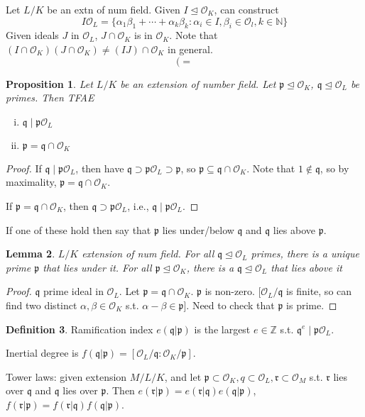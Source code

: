 \documentclass{article}
\theoremstyle{definition}
\newtheorem{defn}{Definition}[section]
\theoremstyle{remark}
\theoremstyle{plain}
\newtheorem{lem}[defn]{Lemma}
\newtheorem{prop}[defn]{Proposition}
\newcommand{\NN}{\mathbb{N}}
\newcommand{\ZZ}{\mathbb{Z}}
\begin{document}
Let $L/K$ be an extn of num field.
Given $I\trianglelefteq\mathcal O_K$, can construct 
\[I\mathcal O_L=\{\alpha_1\beta_1+\cdots+\alpha_k\beta_k:\alpha_i\in I, \beta_i\in\mathcal O_l, k\in\NN\}\]
Given ideals $J$ in $\mathcal O_L$, $J\cap\mathcal O_K$ is in $\mathcal O_K$. Note that
\((I\cap\mathcal{O}_K)(J\cap\mathcal{O}_K)\neq(IJ)\cap\mathcal{O}_K\) in general.
\[(=\tag{Owen's Signature}\]
\begin{prop}
    Let $L/K$ be an extension of number field. Let $\mathfrak p\trianglelefteq\mathcal O_K$, $\mathfrak q\trianglelefteq \mathcal O_L$ be primes. Then TFAE
    \begin{enumerate}[(i)]
        \item $\mathfrak q\mid \mathfrak p\mathcal O_L$\\
        \item $\mathfrak p=\mathfrak q\cap\mathcal O_K$
    \end{enumerate}
\end{prop}
\begin{proof}
    If $\mathfrak q\mid \mathfrak p\mathcal O_L$, then have $\mathfrak q\supset\mathfrak p\mathcal O_L\supset\mathfrak p$, so $\mathfrak p\subseteq\mathfrak q\cap\mathcal O_K$. Note that $1\notin \mathfrak q$, so by maximality, $\mathfrak p=\mathfrak q\cap\mathcal O_K$.

    If $\mathfrak p=\mathfrak q\cap\mathcal O_K$, then $\mathfrak q\supset \mathfrak p\mathcal O_L$, i.e., $\mathfrak q\mid \mathfrak p\mathcal O_L$.
\end{proof}
If one of these hold then say that $\mathfrak p$ lies under/below $\mathfrak q$ and $\mathfrak q$ lies above $\mathfrak p$.
\begin{lem}
    $L/K$ extension of num field. For all $\mathfrak q\trianglelefteq\mathcal O_L$ primes, there is a unique prime $\mathfrak p$ that lies under it. For all $\mathfrak p\trianglelefteq \mathcal O_K$, there is a $\mathfrak q\trianglelefteq \mathcal O_L$ that lies above it
\end{lem}
\begin{proof}
    $\mathfrak q$ prime ideal in $\mathcal O_L$. Let $\mathfrak p=\mathfrak q\cap \mathcal O_K$. $\mathfrak p$ is non-zero. [$\mathcal O_L/\mathfrak q$ is finite, so can find two distinct $\alpha,\beta\in\mathcal O_K$ s.t. $\alpha-\beta\in\mathfrak p$]. Need to check that $\mathfrak p$ is prime.
\end{proof}
\begin{defn}
    Ramification index $e(\mathfrak q|\mathfrak p)$ is the largest $e\in\ZZ$ s.t. $\mathfrak q^e\mid\mathfrak p\mathcal O_L$.

    Inertial degree is $f(\mathfrak q|\mathfrak p)=[\mathcal O_L/\mathfrak q:\mathcal O_K/\mathfrak p]$.
\end{defn}
Tower laws: given extension $M/L/K$, and let $\mathfrak p\subset\mathcal O_K,q\subset \mathcal O_L, \mathfrak r\subset \mathcal O_M$ s.t. $\mathfrak r$ lies over $\mathfrak q$ and $\mathfrak q$ lies over $\mathfrak p$. Then $e(\mathfrak r|\mathfrak p)=e(\mathfrak r|\mathfrak q)e(\mathfrak q|\mathfrak p)$, $f(\mathfrak r|\mathfrak p)=f(\mathfrak r|\mathfrak q)f(\mathfrak q|\mathfrak p)$.
\end{document}

